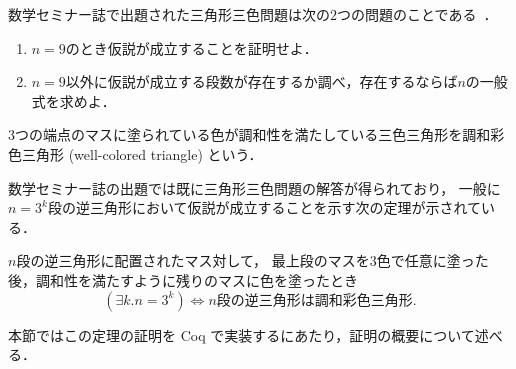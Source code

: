数学セミナー誌で出題された三角形三色問題は次の$2$つの問題のことである~\cite{Nishiyama2}．
\begin{enumerate}
\item \label{que:1}
  $n=9$のとき仮説が成立することを証明せよ．
\item \label{que:2}
  $n=9$以外に仮説が成立する段数が存在するか調べ，存在するならば$n$の一般式を求めよ．
\end{enumerate}
\begin{dfn}[調和彩色三角形] \label{dfn:wc_tri}
  $3$つの端点のマスに塗られている色が調和性を満たしている三色三角形を調和彩色三角形 (well-colored triangle) という．
\end{dfn}

数学セミナー誌の出題では既に三角形三色問題の解答が得られており，
一般に$n=3^k$段の逆三角形において仮説が成立することを示す次の定理が示されている．
\begin{thm} \label{thm:tri_iff}
  $n$段の逆三角形に配置されたマス対して，
  最上段のマスを$3$色で任意に塗った後，調和性を満たすように残りのマスに色を塗ったとき
  \[
  (\exists k.n=3^k) \Leftrightarrow \text{$n$段の逆三角形は調和彩色三角形}.
  \]
\end{thm}

本節ではこの定理の証明を Coq で実装するにあたり，証明の概要について述べる．


